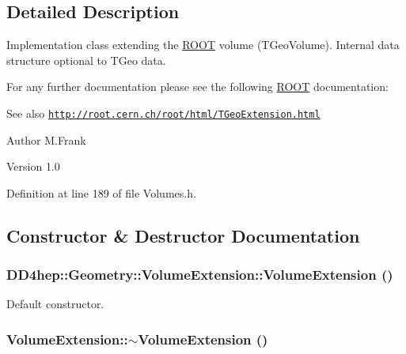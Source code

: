 \subsection{Detailed Description}
Implementation class extending the \hyperlink{namespace_r_o_o_t}{ROOT} volume (TGeoVolume). Internal data structure optional to TGeo data.

For any further documentation please see the following \hyperlink{namespace_r_o_o_t}{ROOT} documentation: \begin{DoxySeeAlso}{See also}
\href{http://root.cern.ch/root/html/TGeoExtension.html}{\tt http://root.cern.ch/root/html/TGeoExtension.html}
\end{DoxySeeAlso}
\begin{DoxyAuthor}{Author}
M.Frank 
\end{DoxyAuthor}
\begin{DoxyVersion}{Version}
1.0 
\end{DoxyVersion}


Definition at line 189 of file Volumes.h.

\subsection{Constructor \& Destructor Documentation}
\hypertarget{class_d_d4hep_1_1_geometry_1_1_volume_extension_aa9342f53440b4c2c5e56c848868368a5}{
\subsubsection[{VolumeExtension}]{\setlength{\rightskip}{0pt plus 5cm}DD4hep::Geometry::VolumeExtension::VolumeExtension ()}}
\label{class_d_d4hep_1_1_geometry_1_1_volume_extension_aa9342f53440b4c2c5e56c848868368a5}


Default constructor. \hypertarget{class_d_d4hep_1_1_geometry_1_1_volume_extension_a86b8adbb7fefd161d386f958db8b9be4}{
\subsubsection[{$\sim$VolumeExtension}]{\setlength{\rightskip}{0pt plus 5cm}VolumeExtension::$\sim$VolumeExtension ()}}
\label{class_d_d4hep_1_1_geometry_1_1_volume_extension_a86b8adbb7fefd161d386f958db8b9be4}


